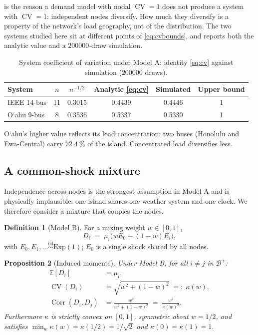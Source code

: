 \documentclass[11pt,a4paper]{article}
\theoremstyle{definition}
\newtheorem{definition}{Definition}[section]
\theoremstyle{plain}
\newtheorem{proposition}[definition]{Proposition}
\theoremstyle{remark}
\newcommand{\E}{\mathbb{E}}
\newcommand{\Corr}{\operatorname{Corr}}
\newcommand{\CV}{\operatorname{CV}}
\newcommand{\okina}{\textquoteleft}
\begin{document}
 is the reason a demand model with nodal $\CV = 1$ does not produce
a system with $\CV = 1$: independent nodes diversify. How much they diversify is
a property of the network's load geography, not of the distribution. The two
systems studied here sit at different points of \eqref{eq:cvbounds}, and
 reports both the analytic value and a $\num{200000}$-draw simulation.

\begin{table}[t]
\centering
\caption{System coefficient of variation under Model A: identity
\eqref{eq:cv} against simulation ($\num{200000}$ draws).}
\label{tab:cv}
\begin{tabular}{lccccc}
\toprule
System & $n$ & $n^{-1/2}$ & Analytic \eqref{eq:cv} & Simulated & Upper bound \\
\midrule
IEEE 14-bus     & 11 & 0.3015 & 0.4439 & 0.4446 & 1 \\
O\okina ahu 9-bus & \phantom{0}8 & 0.3536 & 0.5337 & 0.5330 & 1 \\
\bottomrule
\end{tabular}
\end{table}

O\okina ahu's higher value reflects its load concentration: two buses (Honolulu
and Ewa-Central) carry $\SI{72.4}{\percent}$ of the island. Concentrated load
diversifies less.

\subsection{A common-shock mixture}

Independence across nodes is the strongest assumption in Model A and is
physically implausible: one island shares one weather system and one clock. We
therefore consider a mixture that couples the nodes.

\begin{definition}[Model B]\label{def:modelB}
For a mixing weight $w \in [0,1]$,
\[
D_i \;=\; \mu_i \bigl( w E_0 + (1-w) E_i \bigr),
\]
with $E_0, E_1,\dots \overset{\text{iid}}{\sim} \mathrm{Exp}(1)$; $E_0$ is a
single shock shared by all nodes.
\end{definition}

\begin{proposition}[Induced moments]\label{prop:mixture}
Under Model B, for all $i \ne j$ in $\mathcal{B}^+$:
\begin{align}
\E[D_i] &= \mu_i, \label{eq:mixmean}\\
\CV(D_i) &= \sqrt{w^2 + (1-w)^2} \;=:\; \kappa(w), \label{eq:mixcv}\\
\Corr(D_i, D_j) &= \frac{w^2}{w^2 + (1-w)^2} \;=\; \frac{w^2}{\kappa(w)^2}. \label{eq:mixcorr}
\end{align}
Furthermore $\kappa$ is strictly convex on $[0,1]$, symmetric about $w = 1/2$,
and satisfies $\min_w \kappa(w) = \kappa(1/2) = 1/\sqrt{2}$ and
$\kappa(0)=\kappa(1)=1$.
\end{proposition}
\end{document}
